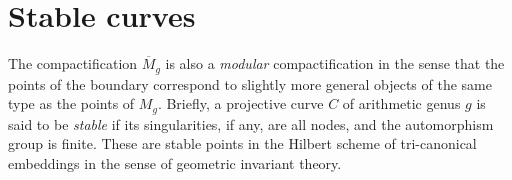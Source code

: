 %
%
%
%
%

\section{Stable curves}

The compactification $\overline M_g$ is also a \emph{modular}  compactification in the sense that the points of the boundary correspond to slightly more general
objects of the same type as the points of $M_g$. 
Briefly, a projective curve $C$ of arithmetic genus $g$ is said to be \emph{stable} if its singularities, if any, are all nodes, and the automorphism group is finite. These are stable points in the Hilbert scheme of tri-canonical embeddings in the sense of geometric invariant theory.

